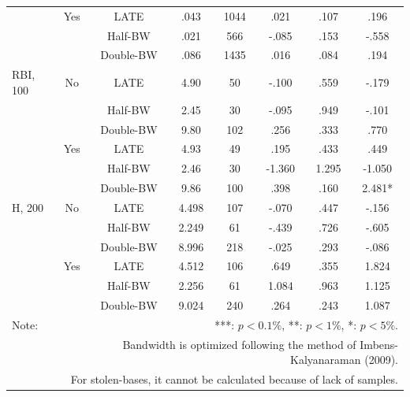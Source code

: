 \documentclass[dvipdfmx, 12pt]{article}
\begin{document}
\begin{table}[H]
\begin{tabular}{@{\extracolsep{0pt}}lccccccc}
    & Yes & LATE & .043 & 1044 & .021 & .107 & .196 \\
    & & Half-BW & .021 & 566 & -.085 & .153 & -.558 \\
    & &Double-BW & .086 & 1435 & .016 & .084 & .194 \\ \hline

    RBI, 100 & No & LATE & 4.90 & 50 & -.100 & .559 & -.179 \\
    & &Half-BW & 2.45 & 30 & -.095 & .949 & -.101 \\
    & &Double-BW & 9.80 & 102 & .256 & .333 & .770 \\ \cline{3-8}

    & Yes & LATE & 4.93 & 49 & .195 & .433 & .449 \\
    & & Half-BW & 2.46 & 30 & -1.360 & 1.295 & -1.050 \\
    & & Double-BW & 9.86 & 100 & .398 & .160 & 2.481* \\ \hline

    H, 200& No & LATE & 4.498 & 107 & -.070 & .447 & -.156 \\
    & & Half-BW & 2.249 & 61 & -.439 & .726 & -.605 \\
    & & Double-BW & 8.996 & 218 & -.025 & .293 & -.086 \\ \cline{3-8}

    & Yes & LATE & 4.512 & 106 & .649 & .355 & 1.824 \\
    & & Half-BW & 2.256 & 61 & 1.084 & .963 & 1.125 \\
    & & Double-BW & 9.024 & 240 & .264 & .243 & 1.087 \\ \hline

    Note: & \multicolumn{7}{r}{***: $p<0.1\%$, **: $p<1\%$, *: $p<5\%$.} \\
    & \multicolumn{7}{r}{Bandwidth is optimized following the method of Imbens-Kalyanaraman (2009).}　\\
    & \multicolumn{7}{r}{
    For stolen-bases, it cannot be calculated because of lack of samples.
    }
  \end{tabular}
\end{table}


\end{document}
